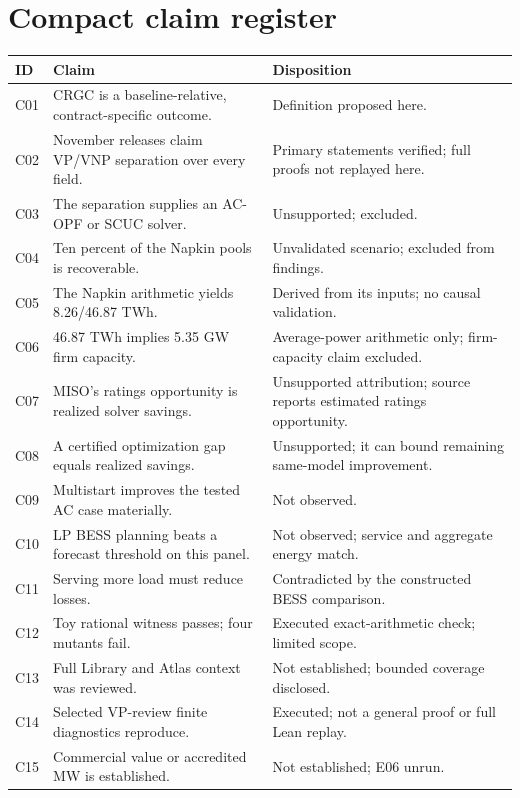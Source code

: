 \documentclass[11pt,letterpaper]{article}
\begin{document}
\section{Compact claim register}
\begingroup\small
\begin{longtable}{P{.10\linewidth}P{.46\linewidth}P{.35\linewidth}}
\toprule ID & Claim & Disposition\\\midrule\endhead
C01 & CRGC is a baseline-relative, contract-specific outcome. & Definition proposed here.\\
C02 & November releases claim VP/VNP separation over every field. & Primary statements verified; full proofs not replayed here.\\
C03 & The separation supplies an AC-OPF or SCUC solver. & Unsupported; excluded.\\
C04 & Ten percent of the Napkin pools is recoverable. & Unvalidated scenario; excluded from findings.\\
C05 & The Napkin arithmetic yields 8.26/46.87 TWh. & Derived from its inputs; no causal validation.\\
C06 & 46.87 TWh implies 5.35 GW firm capacity. & Average-power arithmetic only; firm-capacity claim excluded.\\
C07 & MISO's ratings opportunity is realized solver savings. & Unsupported attribution; source reports estimated ratings opportunity.\\
C08 & A certified optimization gap equals realized savings. & Unsupported; it can bound remaining same-model improvement.\\
C09 & Multistart improves the tested AC case materially. & Not observed.\\
C10 & LP BESS planning beats a forecast threshold on this panel. & Not observed; service and aggregate energy match.\\
C11 & Serving more load must reduce losses. & Contradicted by the constructed BESS comparison.\\
C12 & Toy rational witness passes; four mutants fail. & Executed exact-arithmetic check; limited scope.\\
C13 & Full Library and Atlas context was reviewed. & Not established; bounded coverage disclosed.\\
C14 & Selected VP-review finite diagnostics reproduce. & Executed; not a general proof or full Lean replay.\\
C15 & Commercial value or accredited MW is established. & Not established; E06 unrun.\\
\bottomrule
\end{longtable}
\end{document}

